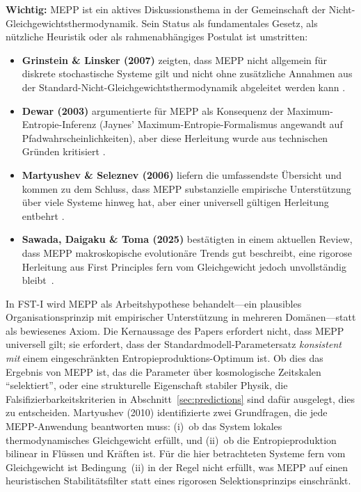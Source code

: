 \documentclass[12pt,a4paper]{article}
\theoremstyle{remark}
\begin{document}
\textbf{Wichtig:} MEPP ist ein aktives Diskussionsthema in der Gemeinschaft der Nicht-Gleichgewichtsthermodynamik. Sein Status als fundamentales Gesetz, als n\"utzliche Heuristik oder als rahmenabh\"angiges Postulat ist umstritten:

\begin{itemize}
    \item \textbf{Grinstein \& Linsker (2007)} zeigten, dass MEPP nicht allgemein f\"ur diskrete stochastische Systeme gilt und nicht ohne zus\"atzliche Annahmen aus der Standard-Nicht-Gleichgewichtsthermodynamik abgeleitet werden kann \citep{GrinsteinLinsker2007}.
    \item \textbf{Dewar (2003)} argumentierte f\"ur MEPP als Konsequenz der Maximum-Entropie-Inferenz (Jaynes' Maximum-Entropie-Formalismus \citep{Jaynes1957} angewandt auf Pfadwahrscheinlichkeiten), aber diese Herleitung wurde aus technischen Gr\"unden kritisiert \citep{Dewar2003}.
    \item \textbf{Martyushev \& Seleznev (2006)} liefern die umfassendste \"Ubersicht und kommen zu dem Schluss, dass MEPP substanzielle empirische Unterst\"utzung \"uber viele Systeme hinweg hat, aber einer universell g\"ultigen Herleitung entbehrt \citep{MartyushevSeleznev2006}.
    \item \textbf{Sawada, Daigaku \& Toma (2025)} best\"atigten in einem aktuellen Review, dass MEPP makroskopische evolution\"are Trends gut beschreibt, eine rigorose Herleitung aus First Principles fern vom Gleichgewicht jedoch unvollst\"andig bleibt~\citep{Toma2025}.
\end{itemize}

In FST-I wird MEPP als Arbeitshypothese behandelt---ein plausibles Organisationsprinzip mit empirischer Unterst\"utzung in mehreren Dom\"anen---statt als bewiesenes Axiom. Die Kernaussage des Papers erfordert nicht, dass MEPP universell gilt; sie erfordert, dass der Standardmodell-Parametersatz \emph{konsistent mit} einem eingeschr\"ankten Entropieproduktions-Optimum ist. Ob dies das Ergebnis von MEPP ist, das die Parameter \"uber kosmologische Zeitskalen ``selektiert'', oder eine strukturelle Eigenschaft stabiler Physik, die Falsifizierbarkeitskriterien in Abschnitt~\ref{sec:predictions} sind daf\"ur ausgelegt, dies zu entscheiden. Martyushev (2010) \citep{Martyushev2010} identifizierte zwei Grundfragen, die jede MEPP-Anwendung beantworten muss: (i)~ob das System lokales thermodynamisches Gleichgewicht erf\"ullt, und (ii)~ob die Entropieproduktion bilinear in Fl\"ussen und Kr\"aften ist. F\"ur die hier betrachteten Systeme fern vom Gleichgewicht ist Bedingung~(ii) in der Regel nicht erf\"ullt, was MEPP auf einen heuristischen Stabilit\"atsfilter statt eines rigorosen Selektionsprinzips einschr\"ankt.
\end{document}
